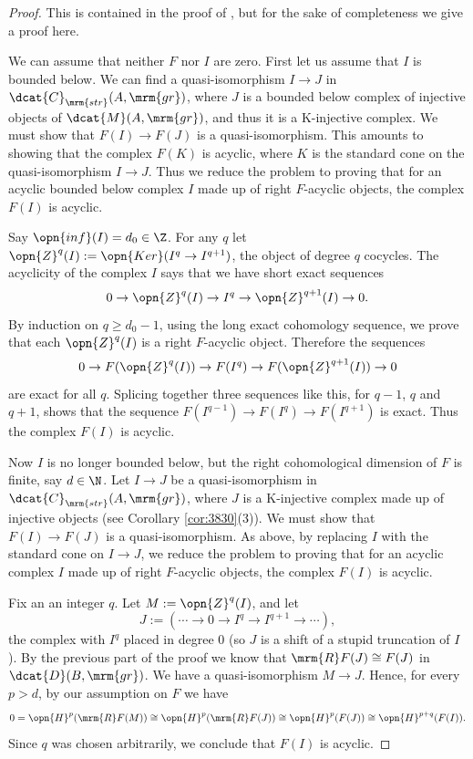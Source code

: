 \begin{proof}
This is contained in the proof of \cite[Corollary I.5.3]{RD}, but for the sake 
of completeness we give a proof here. 

We can assume that neither $F$ nor $I$ are zero. 
First let us assume that $I$ is bounded below.
We can find a quasi-isomorphism $I \to J$ in 
$\dcat{C}_{\mrm{str}}(A, \mrm{gr})$, where $J$ is a bounded below complex 
of injective objects of $\dcat{M}(A, \mrm{gr})$, and thus it is a K-injective 
complex. We must show that 
$F(I) \to F(J)$ is a quasi-isomorphism. 
This amounts to showing that the complex $F(K)$ is acyclic, where $K$ is the 
standard cone on the quasi-isomorphism $I \to J$. Thus we reduce the problem to 
proving that for an acyclic bounded below complex $I$ made up of right 
$F$-acyclic objects, the complex $F(I)$ is acyclic. 

Say $\opn{inf}(I) = d_0 \in \Z$. For any $q$ let 
$\opn{Z}^q(I) := \opn{Ker}(I^q \to I^{q + 1})$, the object of degree 
$q$ cocycles. The acyclicity of the complex $I$ says that we have 
short exact sequences
\[ 0 \to \opn{Z}^{q}(I) \to I^{q} \to \opn{Z}^{q + 1}(I) \to 0 . \]
By induction on $q \geq d_0 - 1$, using the long exact cohomology sequence, we 
prove that each $\opn{Z}^{q}(I)$ is a right $F$-acyclic object.
Therefore the sequences 
\[ 0 \to F(\opn{Z}^{q}(I)) \to F(I^{q}) \to F(\opn{Z}^{q + 1}(I)) \to 0  \]
are exact for all $q$. Splicing together three sequences like this, for  
$q - 1$, $q$ and $q + 1$, shows that the sequence 
$F(I^{q - 1}) \to F(I^q) \to F(I^{q + 1})$
is exact. Thus the complex $F(I)$ is acyclic. 

Now $I$ is no longer bounded below, but the  right cohomological dimension
of $F$ is finite, say $d \in \N$. 
Let $I \to J$ be a quasi-isomorphism in 
$\dcat{C}_{\mrm{str}}(A, \mrm{gr})$, where 
$J$ is a K-injective complex made up of injective objects
(see Corollary \ref{cor:3830}(3)). We must show that 
$F(I) \to F(J)$ is a quasi-isomorphism. As above, by replacing $I$ with the 
standard cone on $I \to J$, we reduce the problem to proving 
that for an acyclic complex $I$ made up of right $F$-acyclic objects, the 
complex $F(I)$ is acyclic. 

Fix an an integer $q$. Let $M := \opn{Z}^q(I)$, and let 
\[ J := (\cdots \to 0 \to I^q \to  I^{q + 1} \to \cdots) , \]
the complex with $I^q$ placed in degree $0$ (so $J$ is a shift of a stupid 
truncation of $I$). By the previous part of the proof 
we know that $\mrm{R} F(J) \cong F(J)$ in $\dcat{D}(B, \mrm{gr})$. 
We have a quasi-isomorphism $M \to J$. Hence, for every $p > d$, 
by our assumption on $F$ we have
\[ 0 = \opn{H}^p(\mrm{R} F(M)) \cong \opn{H}^p(\mrm{R} F(J)) \cong
\opn{H}^p(F(J)) \cong \opn{H}^{p + q}(F(I))  . \]
Since $q$ was chosen arbitrarily, we conclude that $F(I)$ is acyclic.
\end{proof}

